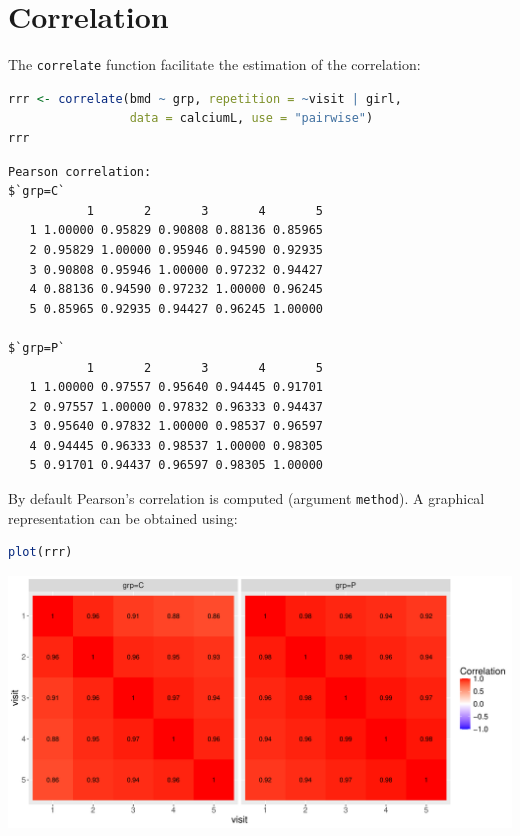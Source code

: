 \documentclass[12pt]{article}
\begin{document}
\section{Correlation}
\label{sec:org3e65672}


The \texttt{correlate} function facilitate the estimation of the correlation:
\begin{lstlisting}[language=r,numbers=none]
rrr <- correlate(bmd ~ grp, repetition = ~visit | girl,
                 data = calciumL, use = "pairwise")
rrr
\end{lstlisting}

\label{}
\begin{verbatim}
Pearson correlation: 
$`grp=C`
           1       2       3       4       5
   1 1.00000 0.95829 0.90808 0.88136 0.85965
   2 0.95829 1.00000 0.95946 0.94590 0.92935
   3 0.90808 0.95946 1.00000 0.97232 0.94427
   4 0.88136 0.94590 0.97232 1.00000 0.96245
   5 0.85965 0.92935 0.94427 0.96245 1.00000

$`grp=P`
           1       2       3       4       5
   1 1.00000 0.97557 0.95640 0.94445 0.91701
   2 0.97557 1.00000 0.97832 0.96333 0.94437
   3 0.95640 0.97832 1.00000 0.98537 0.96597
   4 0.94445 0.96333 0.98537 1.00000 0.98305
   5 0.91701 0.94437 0.96597 0.98305 1.00000
\end{verbatim}

By default Pearson's correlation is computed (argument \texttt{method}). A
graphical representation can be obtained using:
\begin{lstlisting}[language=r,numbers=none]
plot(rrr)
\end{lstlisting}

\begin{center}
\includegraphics[trim={0 0 0 0},width=1\textwidth]{./figures/correlation.pdf}
\end{center}
\end{document}

